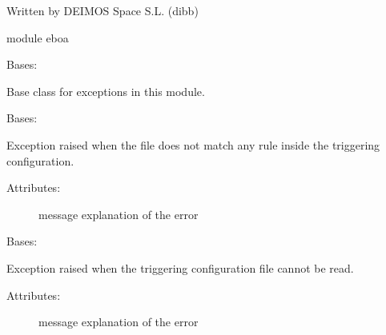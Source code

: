 Written by DEIMOS Space S.L. (dibb)

module eboa

\begin{fulllineitems}
\label{\detokenize{eboa.triggering:eboa.triggering.errors.Error}}
Bases: 

Base class for exceptions in this module.

\end{fulllineitems}


\begin{fulllineitems}
\label{\detokenize{eboa.triggering:eboa.triggering.errors.FileDoesNotMatchAnyRule}}
Bases: {\hyperref[\detokenize{eboa.triggering:eboa.triggering.errors.Error}]{}}

Exception raised when the file does not match any rule inside the triggering configuration.
\begin{description}
\item[{Attributes:}] \leavevmode
message \textendash{} explanation of the error

\end{description}

\end{fulllineitems}


\begin{fulllineitems}
\label{\detokenize{eboa.triggering:eboa.triggering.errors.TriggeringConfigCannotBeRead}}
Bases: {\hyperref[\detokenize{eboa.triggering:eboa.triggering.errors.Error}]{}}

Exception raised when the triggering configuration file cannot be read.
\begin{description}
\item[{Attributes:}] \leavevmode
message \textendash{} explanation of the error

\end{description}

\end{fulllineitems}

